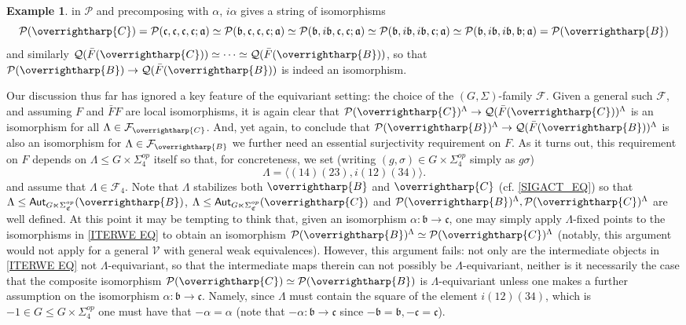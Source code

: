 \documentclass[a4paper,10pt
,draft
]{article}%
\numberwithin{equation}{section}
\numberwithin{figure}{section}
\theoremstyle{definition} %
\newtheorem{example}[equation]{Example}%
\newcommand{\vect}[1]{\text{\overrightharp{\ensuremath{#1}}}}
\newcommand{\F}{\ensuremath{\mathcal F}}
\newcommand{\V}{\ensuremath{\mathcal V}}
\renewcommand{\P}{\ensuremath{\mathcal P}}
\newcommand{\1}{\ensuremath{\mathbbm 1}}%
\begin{document}
\begin{example}
in $\P$ and precomposing  
with $\alpha$, $i \alpha$ gives a string of isomorphisms
\begin{equation}\label{ITERWE EQ}
\P(\vect{C})
=
\P(\mathfrak{c},\mathfrak{c},\mathfrak{c},\mathfrak{c};\mathfrak{a})
\simeq 
\P(\mathfrak{b},\mathfrak{c},\mathfrak{c},\mathfrak{c};\mathfrak{a})
\simeq
\P(\mathfrak{b},i\mathfrak{b},\mathfrak{c},\mathfrak{c};\mathfrak{a})
\simeq
\P(\mathfrak{b},i\mathfrak{b},i\mathfrak{b},\mathfrak{c};\mathfrak{a})
\simeq
\P(\mathfrak{b},i\mathfrak{b},i\mathfrak{b},\mathfrak{b};\mathfrak{a})
=
\P(\vect{B})
\end{equation}
and similarly
$\mathcal{Q}(\bar{F}(\vect{C})) 
\simeq
\cdots 
\simeq
\mathcal{Q}(\bar{F}(\vect{B}))
$,
so that
$\P(\vect{B}) \to \mathcal{Q}(\bar{F}(\vect{B}))$
is indeed an isomorphism.


Our discussion thus far has ignored a key feature of the equivariant setting: the choice of the $(G,\Sigma)$-family $\F$.
Given a general such $\F$, 
and assuming $F$ and $\bar{F} F$ are local isomorphisms,
it is again clear that
$\P(\vect{C})^{\Lambda} \to \mathcal{Q}(\bar{F}(\vect{C}))^{\Lambda}$
is an isomorphism for all $\Lambda \in \F_{\vect{C}}$.
And, yet again, to conclude that
$\P(\vect{B})^{\Lambda} \to \mathcal{Q}(\bar{F}(\vect{B}))^{\Lambda}$
is also an isomorphism for $\Lambda \in \F_{\vect{B}}$ we further need  an essential surjectivity requirement on $F$.
As it turns out, this requirement on $F$ depends on 
$\Lambda \leq G \times \Sigma_4^{op}$ itself so that, for concreteness, we set (writing $(g,\sigma) \in G \times \Sigma_4^{op}$ simply as $g\sigma$)
\[
\Lambda = \langle (14)(23), i (12)(34) \rangle.
\]
and assume that $\Lambda \in \F_4$.
Note that $\Lambda$ stabilizes both 
$\vect{B}$ and $\vect{C}$
(cf. \eqref{SIGACT_EQ})
so that 
$\Lambda \leq \mathsf{Aut}_{G \ltimes \Sigma^{op}_{\mathfrak{C}}}(\vect{B})$,
$\Lambda \leq \mathsf{Aut}_{G \ltimes \Sigma^{op}_{\mathfrak{C}}}(\vect{C})$
and $\P(\vect{B})^{\Lambda}, \P(\vect{C})^{\Lambda}$
are well defined.
At this point it may be tempting to think that, 
given an isomorphism 
$\alpha \colon \mathfrak{b} \to \mathfrak{c}$,
one may simply apply $\Lambda$-fixed points 
to the isomorphisms in \eqref{ITERWE EQ}
to obtain an isomorphism 
$\P(\vect{B})^{\Lambda} \simeq \P(\vect{C})^{\Lambda}$
(notably, this argument would not apply for a general $\V$
with general weak equivalences).
%
However, this argument fails: not only are the intermediate objects
in \eqref{ITERWE EQ} not $\Lambda$-equivariant, so that the intermediate maps therein can not possibly be $\Lambda$-equivariant,
neither is it necessarily the case that the composite isomorphism
$\P(\vect{C}) \simeq \P(\vect{B})$ is $\Lambda$-equivariant
unless one makes a further assumption on the isomorphism
$\alpha\colon \mathfrak{b} \to \mathfrak{c}$.
Namely, since $\Lambda$
must contain the square of the element $i(12)(34)$,
which is $-1 \in G \leq G \times \Sigma_4^{op}$
one must have that 
$-\alpha =\alpha$
(note that $-\alpha \colon \mathfrak{b} \to \mathfrak{c}$
since $-\mathfrak{b}=\mathfrak{b},-\mathfrak{c}=\mathfrak{c}$).


\end{example}
\end{document}
